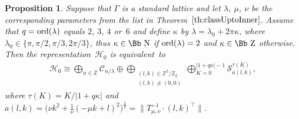 \documentclass[10pt,a4paper]{amsart}
\newcommand\NN{{\mbox{\Bb N}}}
\newcommand\ZZ{{\mbox{\Bb Z}}}
\newcommand\Z{{\mathbb Z}}
\newcommand\cC{{\mathcal C}}
\newcommand\cH{{\mathcal H}}
\newcommand{\ord}{{\rm ord}}
\numberwithin{equation}{section}
\newtheorem{Proposition}[Theorem]{Proposition}
 { \theoremstyle{definition}
\newtheorem{Definition}[Theorem]{Definition}
\newtheorem{Note}[Theorem]{Note}
\newtheorem{Example}[Theorem]{Example}
\newtheorem{Remark}[Theorem]{Remark} }
\begin{document}
\begin{Proposition} \label{pr:H0}
Suppose that $\Gamma$ is a standard lattice and let $\lambda$, $\mu$, $\nu$ be the corresponding parameters from the list in Theorem~$\ref{th:classUptoInner}$. Assume that $q=\ord(\lambda)$ equals $2$, $3$, $4$ or~$6$ and define $\kappa$ by $\lambda=\lambda_0+2\pi\kappa$, where $\lambda_0\in\{\pi,\pi/2,\pi/3,2\pi/3\}$, thus $\kappa\in\NN$ if $\ord(\lambda)=2$ and $\kappa\in\ZZ$ otherwise.
Then the representation~$\cH_0$ is equivalent~to
\begin{gather*}
\cH_0\cong\bigoplus_{n\in \Z} \cC_{n/\lambda} \oplus \bigoplus _{\substack{(l,k)\in\Z^2/\Z_q\\(l,k)\not=(0,0)}} \bigoplus_{K=0}^{|1+q\kappa|-1} {\mathcal S}_{a(l,k)}^{\tau(K)},
\end{gather*}
where $\tau(K)=K/|1+q\kappa|$ and $a(l,k)=\big(\nu k^2 +\frac1\nu(-\mu k+l)^2\big)^{\frac12}=\big\|T_{\mu,\nu}^{-1}\cdot(l,k)^\top\big\|$.
\end{Proposition}
\end{document}

